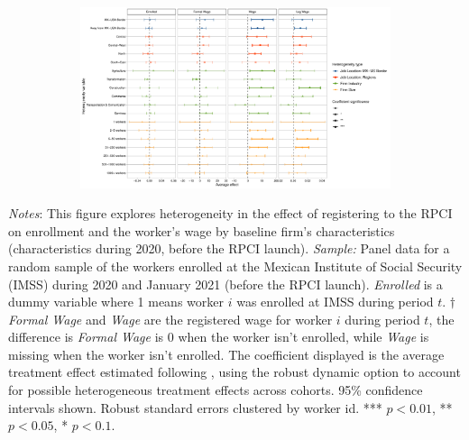 \documentclass[10pt, oneside]{book}
\begin{document}
\begin{figure}[H]
    \centering
    \caption{Heterogeneity by firm characteristics \label{fig:heterogeneity_firm_rpci}}
    
    \begin{subfigure}{\textwidth}
    \includegraphics[width=\textwidth]{04_Figures/muestra_10porciento/dcdh_heterogeneity_firm_characteristics.pdf}
    \end{subfigure}
    
\end{figure}

\scriptsize{
\noindent \textit{Notes}: This figure explores heterogeneity in the effect of registering to the RPCI on enrollment and the worker's wage by baseline firm's characteristics (characteristics during 2020, before the RPCI launch). \textit{Sample:} Panel data for a random sample of the workers enrolled at the Mexican Institute of Social Security (IMSS) during 2020 and January 2021 (before the RPCI launch). \textit{Enrolled} is a dummy variable where 1 means worker $i$ was enrolled at IMSS during period $t$. $\dagger$ \textit{Formal Wage} and \textit{Wage} are the registered wage for worker $i$ during period $t$, the difference is \textit{Formal Wage} is 0 when the worker isn't enrolled, while \textit{Wage} is missing when the worker isn't enrolled. The coefficient displayed is the average treatment effect estimated following \cite{de2020two}, using the robust dynamic option to account for possible heterogeneous treatment effects across cohorts. 95\% confidence intervals shown. Robust standard errors clustered by worker id. *** $p<0.01$, ** $p<0.05$, * $p<0.1$. %
}
\end{document}
